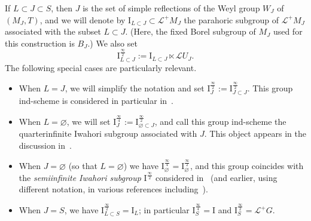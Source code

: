 \documentclass[11pt]{amsart}
\numberwithin{equation}{section}
\theoremstyle{plain}
\theoremstyle{definition}
\newcommand{\I}{{\mathrm I}}
\newcommand{\sL}{{\mathcal L}}
\newcommand{\semi}{{{\frac{\infty}{2}}}}
\newcommand{\quar}{{{\frac{\infty}{4}}}}
\begin{document}
If $L \subset J \subset S$, then $J$ is the set of simple reflections of the Weyl group $W_J$ of $(M_J,T)$, and we will denote by
$\I_{L \subset J}\subset \sL^+M_J$ the parahoric subgroup of $\sL^+ M_J$ associated with the subset $L \subset J$. (Here, the fixed Borel subgroup of $M_J$ used for this construction is $B_J$.)
We also set
\[
\I^\semi_{L \subset J} := \I_{L \subset J} \ltimes \sL U_J.
\]
The following special cases are particularly relevant.
\begin{itemize}
\item
When $L=J$, we will simplify the notation and set $\I_{J}^{\semi} := \I_{J \subset J}^{\semi}$. This group ind-scheme
is considered in particular in~\cite{DL23}.
\item
When $L=\varnothing$, we will set $\I_{J}^{\quar}:= \I_{\varnothing \subset J}^\semi$, and call this group ind-scheme the quarterinfinite Iwahori subgroup associated with $J$. This object appears in the discussion in~\cite[\S 8.11]{bez-losev}.
\item
When $J=\varnothing$ (so that $L=\varnothing$) we have $\I_{\varnothing}^{\quar}=\I_{\varnothing}^{\semi}$, and this group coincides with the \textit{semiinfinite Iwahori subgroup} $\I^\semi$ considered in~\cite{adr} (and earlier, using different notation, in various references including~\cite{Gaits18}).
\item
When $J=S$, we have $\I_{L \subset S}^\semi = \I_L$; in particular $\I_{S}^\quar = \I$ and $\I_S^\semi = \sL^+ G$.
\end{itemize}

\end{document}
